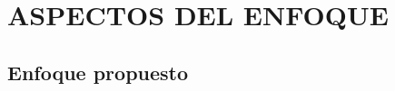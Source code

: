 \chapter{ASPECTOS DEL ENFOQUE}
\label{cap-aspectosenfoque}
\setcounter{secnumdepth}{0}

\blindtext

\setcounter{secnumdepth}{3}
\section{Enfoque propuesto}

\blindtext
